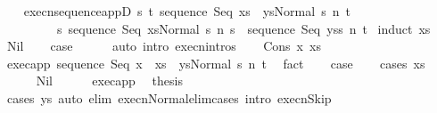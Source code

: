 \begin{isabellebody}
\ \ \isamarkupfalse%
\isanewline
{}\isamarkupfalse%
%
\endisatagproof
{\isafoldproof}%
%
\isadelimproof
\isanewline
%
\endisadelimproof
\isanewline
{}\isamarkupfalse%
\ execn{\isacharunderscore}sequence{\isacharunderscore}appD{\isacharcolon}\ {\isachardoublequoteopen}{\isasymAnd}s\ t{\isachardot}\ {\isasymGamma}{\isasymturnstile}{\isasymlangle}sequence\ Seq\ {\isacharparenleft}xs\ {\isacharat}\ ys{\isacharparenright}{\isacharcomma}Normal\ s{\isasymrangle}\ {\isacharequal}n{\isasymRightarrow}\ t\ {\isasymLongrightarrow}\isanewline
\ \ \ \ \ \ \ \ \ {\isasymexists}s{\isacharprime}{\isachardot}\ {\isasymGamma}{\isasymturnstile}{\isasymlangle}sequence\ Seq\ xs{\isacharcomma}Normal\ s{\isasymrangle}\ {\isacharequal}n{\isasymRightarrow}\ s{\isacharprime}\ {\isasymand}\ {\isasymGamma}{\isasymturnstile}{\isasymlangle}sequence\ Seq\ ys{\isacharcomma}s{\isacharprime}{\isasymrangle}\ {\isacharequal}n{\isasymRightarrow}\ t{\isachardoublequoteclose}\isanewline
%
\isadelimproof
%
\endisadelimproof
%
\isatagproof
{}\isamarkupfalse%
\ {\isacharparenleft}induct\ xs{\isacharparenright}\isanewline
\ \ \isamarkupfalse%
\ Nil\isanewline
\ \ \isamarkupfalse%
\ {\isacharquery}case\isanewline
\ \ \ \ \isamarkupfalse%
\ {\isacharparenleft}auto\ intro{\isacharcolon}\ execn{\isachardot}intros{\isacharparenright}\isanewline
{}\isamarkupfalse%
\isanewline
\ \ \isamarkupfalse%
\ {\isacharparenleft}Cons\ x\ xs{\isacharparenright}\isanewline
\ \ \isamarkupfalse%
\ exec{\isacharunderscore}app{\isacharcolon}\ {\isachardoublequoteopen}{\isasymGamma}{\isasymturnstile}{\isasymlangle}sequence\ Seq\ {\isacharparenleft}{\isacharparenleft}x\ {\isacharhash}\ xs{\isacharparenright}\ {\isacharat}\ ys{\isacharparenright}{\isacharcomma}Normal\ s{\isasymrangle}\ {\isacharequal}n{\isasymRightarrow}\ t{\isachardoublequoteclose}\ \isamarkupfalse%
\ fact\isanewline
\ \ \isamarkupfalse%
\ {\isacharquery}case\isanewline
\ \ \isamarkupfalse%
\ {\isacharparenleft}cases\ xs{\isacharparenright}\isanewline
\ \ \ \ \isamarkupfalse%
\ Nil\isanewline
\ \ \ \ \isamarkupfalse%
\ exec{\isacharunderscore}app\ \isamarkupfalse%
\ {\isacharquery}thesis\isanewline
\ \ \ \ \ \ \isamarkupfalse%
\ {\isacharparenleft}cases\ ys{\isacharparenright}\ {\isacharparenleft}auto\ elim{\isacharcolon}\ execn{\isacharunderscore}Normal{\isacharunderscore}elim{\isacharunderscore}cases\ intro{\isacharcolon}\ execn{\isacharunderscore}Skip{\isacharprime}{\isacharparenright}\isanewline

\end{isabellebody}
